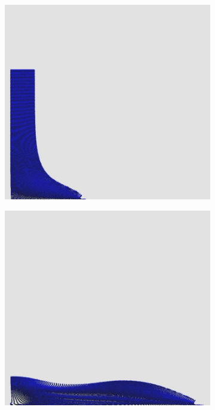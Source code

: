 \documentclass[12pt,a4paper,dvipsnames]{article}
\begin{document}
\begin{figure}[!ht]
\begin{subfigure}[!h]{0.3\textwidth}
	\end{subfigure}
	\begin{subfigure}[!h]{0.3\textwidth} \centering
		\includegraphics[width=\textwidth]{VDB/VDB-03.jpg}
	\end{subfigure}
	\begin{subfigure}[!h]{0.3\textwidth} \centering
		\includegraphics[width=\textwidth]{VDB/VDB-04.jpg}

\end{subfigure}
\end{figure}
\end{document}
